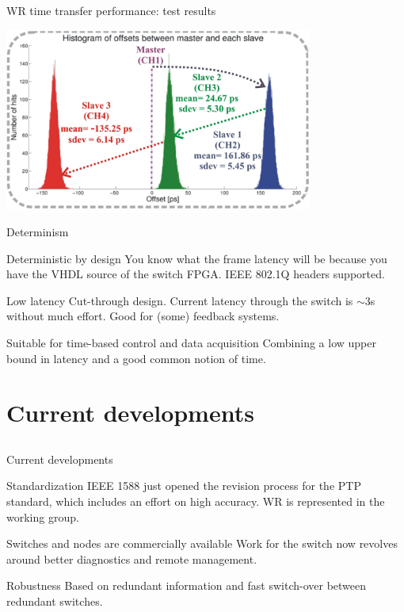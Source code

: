\documentclass[compress, red]{beamer}
\begin{document}
\begin{frame}{WR time transfer performance: test results}

    \begin{center}
    \includegraphics[height=6.0cm]{measurements/meas_results2.pdf}
    \end{center}

\end{frame}

\begin{frame}{Determinism}
\pause
 \begin{block}{Deterministic by design}
  You know what the frame latency will be because you have the VHDL
  source of the switch FPGA. IEEE 802.1Q headers supported.
 \end{block}
\pause
 \begin{block}{Low latency}
  Cut-through design. Current latency through the switch is
  $\sim$3\textmu s without much effort. Good for (some) feedback systems.
 \end{block}
\pause 
 \begin{block}{Suitable for time-based control and data acquisition}
  Combining a low upper bound in latency and a good common notion of time. 
 \end{block}

\end{frame}

\section{Current developments}
\subsection{}

\begin{frame}{Current developments}
\pause
 \begin{block}{Standardization}
  IEEE 1588 just opened the revision process for the PTP standard,
  which includes an effort on high accuracy. WR is represented in the
  working group.
 \end{block}
\pause
 \begin{block}{Switches and nodes are commercially available}
  Work for the switch now revolves around better diagnostics and
  remote management.
 \end{block}
\pause
 \begin{block}{Robustness}
  Based on redundant information and fast switch-over between
  redundant switches. 
 \end{block}
\end{frame}
\end{document}
